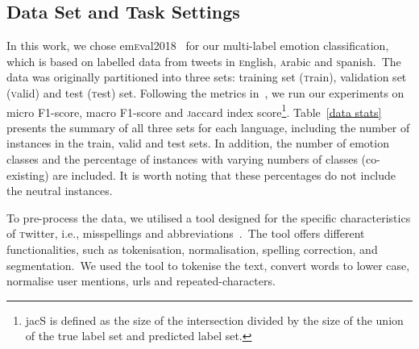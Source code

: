 \documentclass[11pt,a4paper]{article}
\begin{document}
\subsection{Data Set and Task Settings}\label{data}
In this work, we chose em\textsc{e}val2018~\cite{Mohammad2018semeval} for our multi-label emotion classification, which is based on labelled data from tweets in \textsc{e}nglish, \textsc{a}rabic and \textsc{s}panish.~The data was originally partitioned into three sets: training set (\textsc{t}rain), validation set (\textsc{v}alid) and test (\textsc{t}est) set. Following the metrics in~, we run our experiments on micro F1-score, macro F1-score and \textsc{j}accard index score\footnote{jacS is defined as the size of the intersection divided by the size of the union of the true label set and predicted label set.}. Table~\ref{data stats} presents the summary of all three sets for each language, including the number of instances in the train, valid and test sets. In addition, the number of emotion classes and the percentage of instances with varying numbers of classes (co-existing) are included. It is worth noting that these percentages do not include the neutral instances.\begin{table}[htbp]
  \centering
    \caption{Data Statistics. co.emo: refers to the percentage of co-existing emotions.}
  \label{data stats}\end{table}

To pre-process the data, we utilised a tool designed for the specific characteristics of \textsc{t}witter, i.e., misspellings and abbreviations~\cite{baziotis2017datastories}.~The tool offers different functionalities, such as tokenisation, normalisation, spelling correction, and segmentation.~We used the tool to tokenise the text, convert words to lower case, normalise user mentions, urls and repeated-characters.
\end{document}
